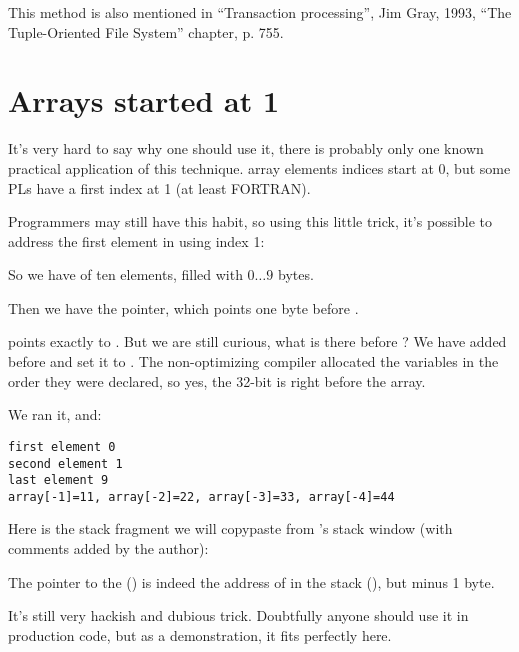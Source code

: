 This method is also mentioned in ``Transaction processing'', Jim Gray, 1993,
``The Tuple-Oriented File System'' chapter, p. 755.

\section{Arrays started at 1}

It's very hard to say why one should use it, there is probably only one known practical application
of this technique.
\CCpp array elements indices start at 0, but some \ac{PL}s have a first index at 1 
(at least FORTRAN).

Programmers may still have this habit, so using this little trick, it's possible to address the first element
in \CCpp using index 1:





So we have  of ten elements, filled with $0 \ldots 9$ bytes.

Then we have the  pointer, which points one byte before .

 points exactly to .
But we are still curious, what is there before ?
We have added  before  and set 
it to .
The non-optimizing compiler allocated the variables in the order they were declared, so yes, the 32-bit 
is right before the array.

We ran it, and:

\begin{lstlisting}
first element 0
second element 1
last element 9
array[-1]=11, array[-2]=22, array[-3]=33, array[-4]=44
\end{lstlisting}

Here is the stack fragment we will copypaste from \olly's stack window (with comments added by the author):



The pointer to the  () is indeed 
the address of  in the stack (), 
but minus 1 byte.

It's still very hackish and dubious trick. Doubtfully anyone should use it in production code,
but as a demonstration, it fits perfectly here.


